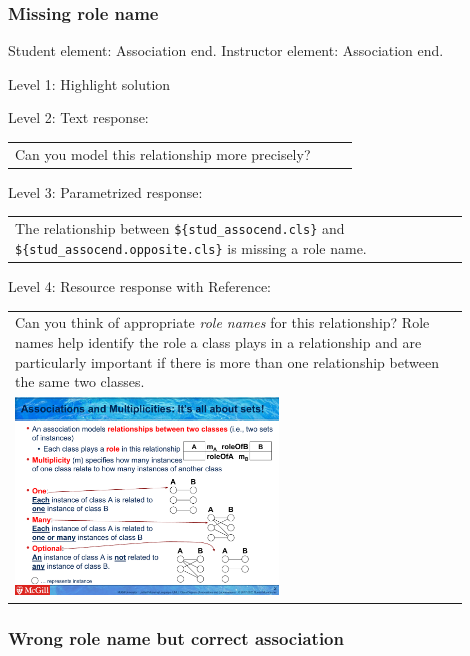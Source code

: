 \subsubsection{Missing role name}

Student element: Association end. Instructor element: Association end. \medskip

\noindent Level 1: Highlight solution  \medskip

\noindent Level 2: Text response: \medskip

\begin{tabular}{|p{0.9\linewidth}}
Can you model this relationship more precisely?
\end{tabular} \medskip

\noindent Level 3: Parametrized response: \medskip

\begin{tabular}{|p{0.9\linewidth}}
The relationship between \verb|${stud_assocend.cls}| and \verb|${stud_assocend.opposite.cls}| is missing a role name.
\end{tabular} \medskip

\noindent Level 4: Resource response with Reference: \medskip

\begin{tabular}{|p{0.9\linewidth}}
Can you think of appropriate \textit{role names}
for this relationship? Role names help identify the role a class plays in a
relationship and are particularly important if there is more than one relationship
between the same two classes.

\\
\includegraphics[width=0.6\textwidth]{images/role_name.png}
\end{tabular} \medskip


\subsubsection{Wrong role name but correct association}


